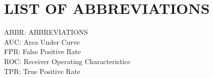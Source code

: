 \chapter*{LIST OF ABBREVIATIONS}

ABBR\hspace{15mm}: ABBREVIATIONS\\
AUC\hspace{15mm}: Area Under Curve\\
FPR\hspace{16mm}: False Positive Rate\\
ROC\hspace{15mm}: Receiver Operating Characteristics\\
TPR\hspace{16mm}: True Positive Rate\\
